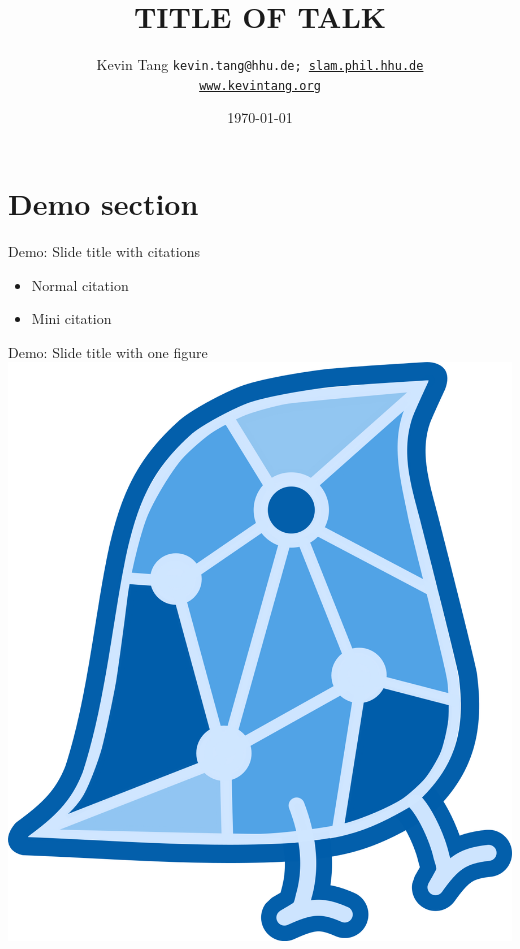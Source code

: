 \documentclass{beamer}
\title{TITLE OF TALK}
\author[shortname]{Kevin Tang\newline
	\newline\texttt{\footnotesize{kevin.tang@hhu.de}; \footnotesize{\url{slam.phil.hhu.de}}\\ \footnotesize{\url{www.kevintang.org}}}}
\date{\today}
\institute[shortinst]{Heinrich Heine University Düsseldorf}
\newcommand{\cit}[1]{{\tiny #1}}
\begin{document}
\newcommand{\newemph}[1]{{\color{carmine}{{#1}}}}
\frame{
  \titlepage
}





\newcommand{\flagKT}[1]{{\color{blue}{\textbf{#1}}}}


\section{Demo section}

\begin{frame}{Demo: Slide title with citations}
\begin{itemize}
\item Normal citation \citep{TangShaw_2021_ProsodyCognition}
\item Mini citation \cit{\citep{TangShaw_2021_ProsodyCognition}}
\end{itemize}
\end{frame}

\begin{frame}{Demo: Slide title with one figure}
\includegraphics[width=0.7\linewidth]{images/WAG.png}\\
\end{frame}
\end{document}
